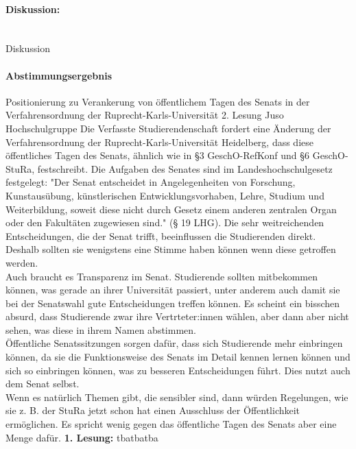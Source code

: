 \paragraph{Diskussion:}\phantom{spacer}\\
Diskussion
\paragraph{Abstimmungsergebnis}
\antrag%
{
    Positionierung zu Verankerung von öffentlichem Tagen des Senats in der Verfahrensordnung der Ruprecht-Karls-Universität
}{
    2. Lesung
}{
    Juso Hochschulgruppe
}{
    Die Verfasste Studierendenschaft fordert eine Änderung der Verfahrensordnung der
    Ruprecht-Karls-Universität Heidelberg, dass diese öffentliches Tagen des Senats,
    ähnlich wie in §3 GeschO-RefKonf und §6 GeschO-StuRa, festschreibt.
}{
    Die Aufgaben des Senates sind im Landeshochschulgesetz festgelegt: "Der Senat entscheidet in
    Angelegenheiten von Forschung, Kunstausübung, künstlerischen Entwicklungsvorhaben, Lehre, Studium und
    Weiterbildung, soweit diese nicht durch Gesetz einem anderen zentralen Organ oder den Fakultäten
    zugewiesen sind." (§ 19 LHG). Die sehr weitreichenden Entscheidungen, die der Senat trifft,
    beeinflussen die Studierenden direkt. Deshalb sollten sie wenigstens eine Stimme haben können wenn
    diese getroffen werden.\\
    Auch braucht es Transparenz im Senat. Studierende sollten mitbekommen können, was gerade an ihrer
    Universität passiert, unter anderem auch damit sie bei der Senatswahl  gute Entscheidungen treffen
    können. Es scheint ein bisschen absurd, dass Studierende zwar ihre Vertrteter:innen wählen, aber dann
    aber nicht sehen, was diese in ihrem Namen abstimmen.\\
    Öffentliche Senatssitzungen sorgen dafür, dass sich Studierende mehr einbringen können, da sie die
    Funktionsweise des Senats im Detail kennen lernen können und sich so einbringen können, was zu
    besseren Entscheidungen führt. Dies nutzt auch dem Senat selbst.\\
    Wenn es natürlich Themen gibt, die sensibler sind,  dann würden Regelungen, wie sie z. B. der
    StuRa jetzt schon hat einen Ausschluss der Öffentlichkeit ermöglichen. Es spricht wenig gegen das
    öffentliche Tagen des Senats aber eine Menge dafür.
}{
    \textbf{1. Lesung:}
    \ul{
    }
}{tba}{tba}{tba}